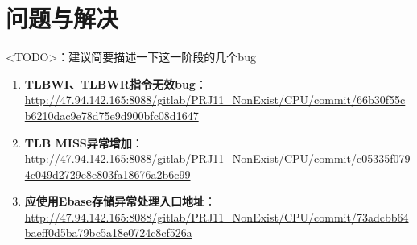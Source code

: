 
\section{问题与解决}

<TODO>：建议简要描述一下这一阶段的几个bug

\begin{enumerate}
    \item {\bf TLBWI、TLBWR指令无效bug}：\url{http://47.94.142.165:8088/gitlab/PRJ11_NonExist/CPU/commit/66b30f55cb6210dac9e78d75e9d900bfc08d1647}
    \item {\bf TLB MISS异常增加}：\url{http://47.94.142.165:8088/gitlab/PRJ11_NonExist/CPU/commit/e05335f0794c049d2729e8e803fa18676a2b6c99}
    \item {\bf 应使用Ebase存储异常处理入口地址}：\url{http://47.94.142.165:8088/gitlab/PRJ11_NonExist/CPU/commit/73adcbb64baeff0d5ba79bc5a18e0724c8cf526a}
\end{enumerate}
